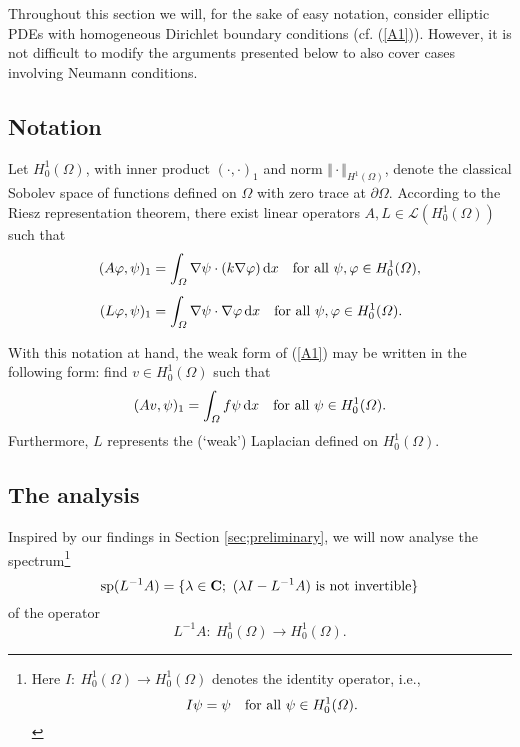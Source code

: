 \documentclass{imanum}
\begin{document}
Throughout this section we will, for the sake of easy notation,
consider elliptic PDEs with homogeneous Dirichlet boundary conditions
(cf. (\ref{A1})). However, it is not difficult to modify the arguments
presented below to also cover cases involving Neumann conditions.


\subsection{Notation}
\label{sec3.1}

Let $H^1_0(\Omega)$, with inner product $(\cdot,\cdot)_1$ and norm
$\Vert {\cdot}\Vert_{H^1(\Omega)}$, denote the classical Sobolev
space of functions defined on $\Omega$ with zero trace at
$\partial \Omega$. According to the Riesz representation theorem,
there exist linear operators $A,L \in \mathcal{L} (H^1_0(\Omega))$
such that
\begin{align}
(A \varphi, \psi)_1 & = \int_\Omega \nabla \psi \cdot
(k \nabla \varphi) \, \mathrm{d}x
\quad \hbox{for all}\ \psi, \varphi \in H^1_0(\Omega) ,
\label{B0} \\[4pt]
(L \varphi, \psi)_1 & = \int_\Omega \nabla \psi \cdot
\nabla \varphi \, \mathrm{d}x
\quad \hbox{for all}\ \psi, \varphi \in H^1_0(\Omega) .
\label{B1}
\end{align}

With this notation at hand, the weak form of (\ref{A1}) may be written
in the following form: find $v \in H^1_0(\Omega)$ such that
\begin{equation*}
(A v, \psi)_1 = \int_{\Omega} f \psi \, \mathrm{d}x
\quad \hbox{for all}\ \psi \in H^1_0(\Omega).
\end{equation*}
Furthermore, $L$ represents the (`weak') Laplacian defined on $H^1_0(\Omega)$.


\subsection{The analysis}
\label{sec3.2}

Inspired by our findings in Section \ref{sec;preliminary}, we will
now analyse the spectrum\footnote{Here
$I:\ H^1_0(\Omega) \rightarrow H^1_0(\Omega)$ denotes the identity
operator, i.e.,
\begin{equation*}
I \psi = \psi \quad \hbox{for all}\ \psi \in H^1_0(\Omega).
\end{equation*}}
\begin{equation*}
\mathrm{sp}(L^{-1}A) = \{\lambda \in {\bf C};\
(\lambda I-L^{-1}A) \hbox{ is not invertible} \}
\end{equation*}
of the operator
\begin{equation*}
L^{-1}A:\ H^1_0(\Omega) \rightarrow H^1_0(\Omega).
\end{equation*}
\end{document}

